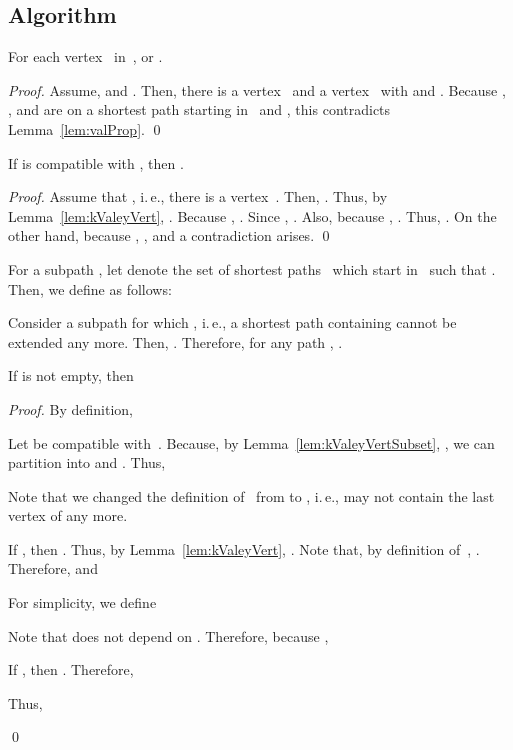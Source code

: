 \documentclass[10pt]{llncs}
\makeatletter
\newcommand{\ie}{i.\,e.\@ifnextchar{,}{}{~}}
\makeatother
\begin{document}
\subsection{Algorithm}

\begin{lemma}
    \label{lem:kValeyVert}
For each vertex~ in~,  or .
\end{lemma}

\begin{proof}
Assume,  and .
Then, there is a vertex~ and a vertex~ with  and .
Because , , and  are on a shortest path starting in~ and , this contradicts Lemma~\ref{lem:valProp}.
\qed
\end{proof}

\begin{lemma}
    \label{lem:kValeyVertSubset}
If  is compatible with , then .
\end{lemma}

\begin{proof}
Assume that , \ie, there is a vertex~.
Then, .
Thus, by Lemma~\ref{lem:kValeyVert}, .
Because , .
Since , .
Also, because , .
Thus, .
On the other hand, because , , and a contradiction arises.
\qed
\end{proof}

For a subpath , let  denote the set of shortest paths~ which start in~ such that .
Then, we define  as follows:

Consider a subpath  for which , \ie, a shortest path containing  cannot be extended any more.
Then, .
Therefore, for any path , .

\begin{lemma}
    \label{lem:valEpsilon}
If  is not empty, then

\end{lemma}

\begin{proof}
By definition,

Let  be compatible with~.
Because, by Lemma~\ref{lem:kValeyVertSubset}, , we can partition  into  and .
Thus, 

Note that we changed the definition of~ from  to , \ie,  may not contain the last vertex of  any more.

If , then .
Thus, by Lemma~\ref{lem:kValeyVert}, .
Note that, by definition of~, .
Therefore,  and

For simplicity, we define

Note that  does not depend on .
Therefore, because ,

If , then .
Therefore,

Thus,

\qed
\end{proof}
\end{document}
